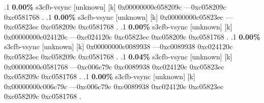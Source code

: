 \begin{profile}
{.1 \textbf{ 0.00\%} s3cfb-vsync      [unknown]              [k] 0x00000000c058209c\newline {} ---0xc058209c\newline {} 0xc0581768\newline {} . 
.1 \textbf{ 0.00\%} s3cfb-vsync      [unknown]              [k] 0x00000000c05823ec\newline {} ---0xc05823ec\newline {} 0xc058209c\newline {} 0xc0581768\newline {} . 
.1 \textbf{ 0.00\%} s3cfb-vsync      [unknown]              [k] 0x00000000c024120c\newline {} ---0xc024120c\newline {} 0xc05823ec\newline {} 0xc058209c\newline {} 0xc0581768\newline {} . 
.1 \textbf{ 0.00\%} s3cfb-vsync      [unknown]              [k] 0x00000000c0089938\newline {} ---0xc0089938\newline {} 0xc024120c\newline {} 0xc05823ec\newline {} 0xc058209c\newline {} 0xc0581768\newline {} . 
.1 \textbf{ 0.04\%} s3cfb-vsync      [unknown]              [k] 0x00000000c0581768\newline {} ---0xc006c79c\newline {} 0xc0089938\newline {} 0xc024120c\newline {} 0xc05823ec\newline {} 0xc058209c\newline {} 0xc0581768\newline {} . 
.1 \textbf{ 0.00\%} s3cfb-vsync      [unknown]              [k] 0x00000000c006c79c\newline {} ---0xc006c79c\newline {} 0xc0089938\newline {} 0xc024120c\newline {} 0xc05823ec\newline {} 0xc058209c\newline {} 0xc0581768\newline {} . 
}
\end{profile}
